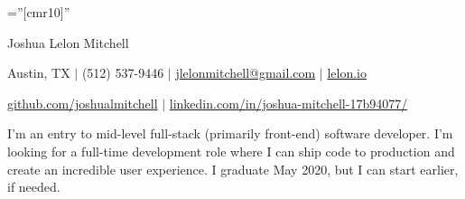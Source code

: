 \documentclass[a4paper,10pt]{article}
\begin{document}

\pagestyle{empty} %

\font\fb=''[cmr10]'' %

\par{\centering
		{\Huge Joshua Lelon Mitchell
	}\par}
\par{\centering
		{
	Austin, TX
	$\mid$
	(512) 537-9446
	$\mid$
	\href {mailto:jlelonmitchell@gmail.com}{jlelonmitchell@gmail.com}
	$\mid$
	\href {https://lelon.io/}{lelon.io}
}\par}
\par{\centering
		{
	\href {https://github.com/joshualmitchell}{github.com/joshualmitchell}
	$\mid$
	\href {https://www.linkedin.com/in/joshua-mitchell-17b94077/}{linkedin.com/in/joshua-mitchell-17b94077/}
}\par}

\begin{center}
I'm an entry to mid-level full-stack (primarily front-end) software developer. I'm looking for a full-time development role where I can ship code to production and create an incredible user experience. I graduate May 2020, but I can start earlier, if needed. \end{center}

\end{document}
